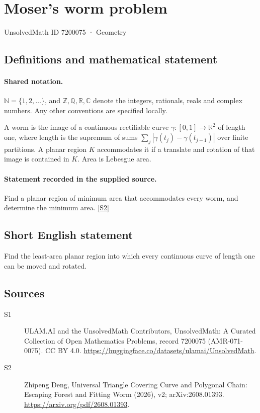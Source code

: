 \documentclass[11pt]{article}
\newcommand{\sref}[2]{\hyperlink{source:#1:#2}{[S#2]}}
\begin{document}
\setcounter{section}{7200074}
\section{Moser's worm problem}\label{7200075}
{\small\sffamily UnsolvedMath ID 7200075 · Geometry}
\subsection{Definitions and mathematical statement}

\paragraph{Shared notation.}$\mathbb N=\{1,2,\ldots\}$, and $\mathbb Z,\mathbb Q,\mathbb R,\mathbb C$ denote the integers, rationals, reals and complex numbers. Any other conventions are specified locally.


A worm is the image of a continuous rectifiable curve $\gamma:[0,1]\to\mathbb R^2$ of length one, where length is the supremum of sums $\sum_j|\gamma(t_j)-\gamma(t_{j-1})|$ over finite partitions. A planar region $K$ accommodates it if a translate and rotation of that image is contained in $K$. Area is Lebesgue area.
\paragraph{Statement recorded in the supplied source.}
Find a planar region of minimum area that accommodates every worm, and determine the minimum area. \sref{7200075}{2}
\subsection{Short English statement}
Find the least-area planar region into which every continuous curve of length one can be moved and rotated.
\subsection{Sources}
\begin{description}
\item[\hypertarget{source:7200075:1}{S1}] ULAM.AI and the UnsolvedMath Contributors, UnsolvedMath: A Curated Collection of Open Mathematics Problems, record 7200075 (AMR-071-0075). CC BY 4.0. \url{https://huggingface.co/datasets/ulamai/UnsolvedMath}.
\item[\hypertarget{source:7200075:2}{S2}] Zhipeng Deng, Universal Triangle Covering Curve and Polygonal Chain: Escaping Forest and Fitting Worm (2026), v2; arXiv:2608.01393. \url{https://arxiv.org/pdf/2608.01393}.
\end{description}
\label{end:7200075}
\end{document}
